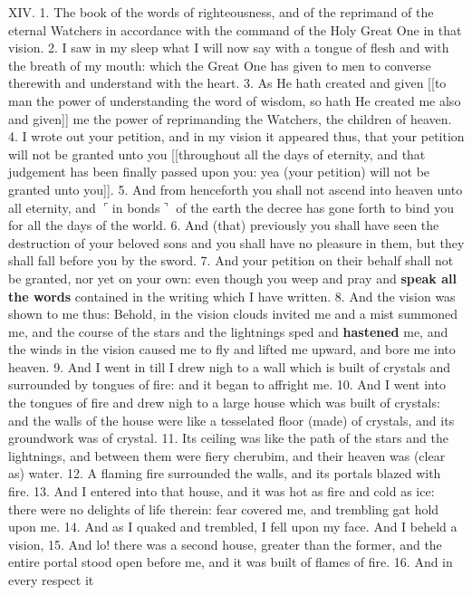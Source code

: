 XIV. 1. The book of the words of righteousness,
and of the reprimand of the eternal Watchers in
accordance with the command of the Holy Great
One in that vision. 2. I saw in my sleep what I
will now say with a tongue of flesh and with the
breath of my mouth: which the Great One has given
to men to converse therewith and understand with
the heart. 3. As He hath created and given [[to man
the power of understanding the word of wisdom, so
hath He created me also and given]] me the power of
reprimanding the Watchers, the children of heaven.
4. I wrote out your petition, and in my vision it
appeared thus, that your petition will not be granted
unto you [[throughout all the days of eternity, and
that judgement has been finally passed upon you:
yea (your petition) will not be granted unto you]].
5. And from henceforth you shall not ascend into
heaven unto all eternity, and $\ulcorner$in bonds$\urcorner$ of the earth
the decree has gone forth to bind you for all the days
of the world. 6. And (that) previously you shall
have seen the destruction of your beloved sons and you
shall have no pleasure in them, but they shall fall before
you by the sword. 7. And your petition on their
behalf shall not be granted, nor yet on your own:
even though you weep and pray and \textbf{speak all the
words} contained in the writing which I have written.
8. And the vision was shown to me thus: Behold,
in the vision clouds invited me and a mist summoned
me, and the course of the stars and the lightnings
sped and \textbf{hastened} me, and the winds in the vision
caused me to fly and lifted me upward, and bore me
into heaven. 9. And I went in till I drew nigh to a
wall which is built of crystals and surrounded by
tongues of fire: and it began to affright me. 10. And
I went into the tongues of fire and drew nigh to a large
house which was built of crystals: and the walls of
the house were like a tesselated floor (made) of
crystals, and its groundwork was of crystal. 11. Its
ceiling was like the path of the stars and the lightnings,
and between them were fiery cherubim, and
their heaven was (clear as) water. 12. A flaming
fire surrounded the walls, and its portals blazed with
fire. 13. And I entered into that house, and it was
hot as fire and cold as ice: there were no delights of
life therein: fear covered me, and trembling gat hold
upon me. 14. And as I quaked and trembled, I fell
upon my face. And I beheld a vision, 15. And
lo! there was a second house, greater than the former,
and the entire portal stood open before me, and it was
built of flames of fire. 16. And in every respect it
